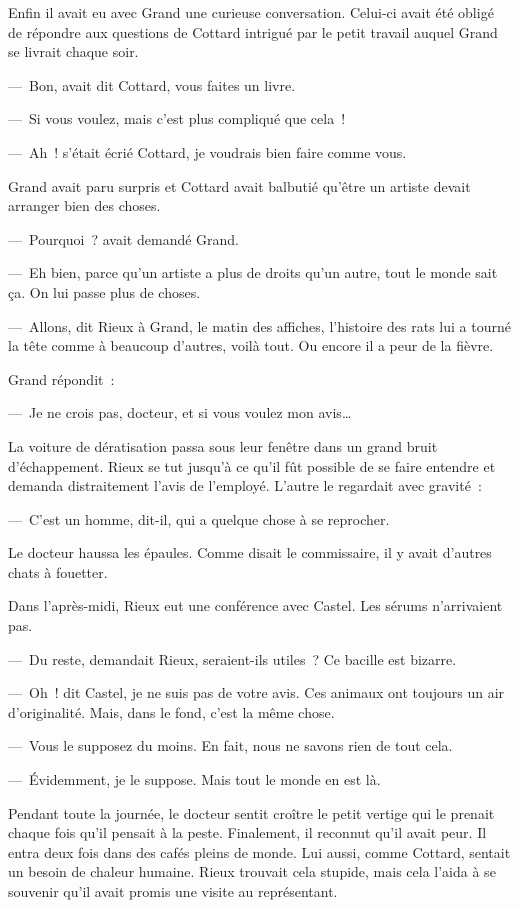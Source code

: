 \documentclass[french,twoside]{book} %
\begin{document}
Enfin il avait eu avec Grand une curieuse conversation. Celui-ci avait été obligé de répondre aux questions de Cottard intrigué par le petit travail auquel Grand se livrait chaque soir.\par
— Bon, avait dit Cottard, vous faites un livre.\par
— Si vous voulez, mais c’est plus compliqué que cela !\par
— Ah ! s’était écrié Cottard, je voudrais bien faire comme vous.\par
Grand avait paru surpris et Cottard avait balbutié qu’être un artiste devait arranger bien des choses.\par
— Pourquoi ? avait demandé Grand.\par
— Eh bien, parce qu’un artiste a plus de droits qu’un autre, tout le monde sait ça. On lui passe plus de choses.\par
— Allons, dit Rieux à Grand, le matin des affiches, l’histoire des rats lui a tourné la tête comme à beaucoup d’autres, voilà tout. Ou encore il a peur de la fièvre.\par
Grand répondit :\par
— Je ne crois pas, docteur, et si vous voulez mon avis…\par
La voiture de dératisation passa sous leur fenêtre dans un grand bruit d’échappement. Rieux se tut jusqu’à ce qu’il fût possible de se faire entendre et demanda distraitement l’avis de l’employé. L’autre le regardait avec gravité :\par
— C’est un homme, dit-il, qui a quelque chose à se reprocher.\par
Le docteur haussa les épaules. Comme disait le commissaire, il y avait d’autres chats à fouetter.\par
Dans l’après-midi, Rieux eut une conférence avec Castel. Les sérums n’arrivaient pas.\par
— Du reste, demandait Rieux, seraient-ils utiles ? Ce bacille est bizarre.\par
— Oh ! dit Castel, je ne suis pas de votre avis. Ces animaux ont toujours un air d’originalité. Mais, dans le fond, c’est la même chose.\par
— Vous le supposez du moins. En fait, nous ne savons rien de tout cela.\par
— Évidemment, je le suppose. Mais tout le monde en est là.\par
Pendant toute la journée, le docteur sentit croître le petit vertige qui le prenait chaque fois qu’il pensait à la peste. Finalement, il reconnut qu’il avait peur. Il entra deux fois dans des cafés pleins de monde. Lui aussi, comme Cottard, sentait un besoin de chaleur humaine. Rieux trouvait cela stupide, mais cela l’aida à se souvenir qu’il avait promis une visite au représentant.\par
\end{document}
